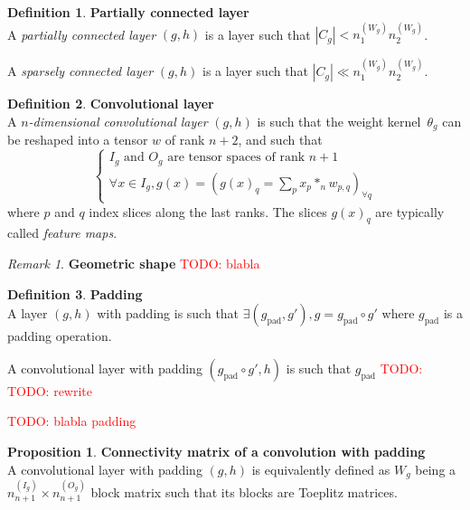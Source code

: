 \documentclass{article}
\theoremstyle{definition}
\newtheorem{definition}{Definition}[section]
\newtheorem{proposition}{Proposition}[section]
\theoremstyle{remark}
\newtheorem{remark}{Remark}[section]
\theoremstyle{plain}
\newcommand{\todo}[1]{\textcolor{red}{TODO: #1\\}}
\begin{document}
\begin{definition}\textbf{Partially connected layer}\\
A \emph{partially connected layer} $(g,h)$ is a layer such that $|C_g| < n_1^{(W_g)} n_2^{(W_g)}$.

A \emph{sparsely connected layer} $(g,h)$ is a layer such that $|C_g| \ll n_1^{(W_g)} n_2^{(W_g)}$.
\end{definition}

\begin{definition}\textbf{Convolutional layer}\\
A \emph{$n$-dimensional convolutional layer} $(g,h)$ is such that the weight kernel~$\theta_g$ can be reshaped into a tensor $w$ of rank $n+2$, and such that
$$
\left\{
\begin{array}{l}
  I_g \mbox{ and } O_g \mbox{ are tensor spaces of rank }n+1 \\
  \forall x \in I_g, g(x) = (g(x)_q = \sum\limits_p{x_p \ast_n w_{p,q}})_{\forall q}
\end{array}
\right.
$$
where $p$ and $q$ index slices along the last ranks. The slices $g(x)_q$ are typically called \textit{feature maps}.
\end{definition}

\begin{remark}\textbf{Geometric shape}
\todo{blabla}
\end{remark}

\begin{definition}\textbf{Padding}\\
A layer $(g, h)$ with padding is such that $\exists (g_\text{pad}, g'), g = g_\text{pad} \circ g'$ where $g_\text{pad}$ is a padding operation.

A convolutional layer with padding $(g_\text{pad} \circ g',h)$ is such that $g_\text{pad}$ \todo{}
\todo{rewrite}
\end{definition}

\todo{blabla padding}

\begin{proposition}\textbf{Connectivity matrix of a convolution with padding}\\
A convolutional layer with padding $(g, h)$ is equivalently defined as $W_g$ being a $n_{n+1}^{(I_g)} \times n_{n+1}^{(O_g)}$ block matrix such that its blocks are Toeplitz matrices.
\end{proposition}
\end{document}

